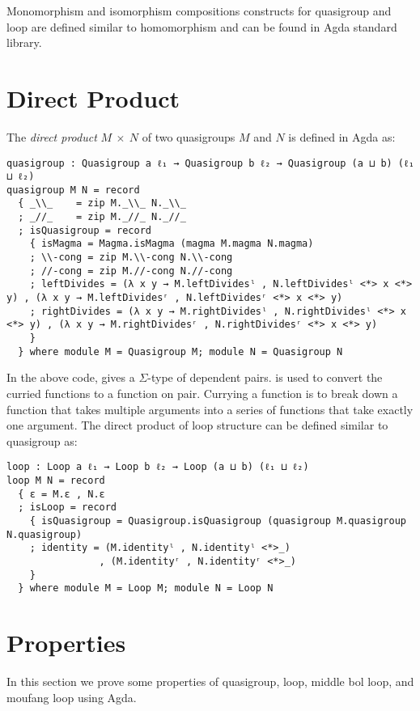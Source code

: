 Monomorphism and isomorphism compositions constructs for quasigroup and loop are
defined similar to homomorphism and can be found in Agda standard library.

\section{Direct Product}
The \textit{direct product} $M \ \times \ N$ of two quasigroups $M$ and $N$ is
defined in Agda as:
\begin{verbatim}
quasigroup : Quasigroup a ℓ₁ → Quasigroup b ℓ₂ → Quasigroup (a ⊔ b) (ℓ₁ ⊔ ℓ₂)
quasigroup M N = record
  { _\\_    = zip M._\\_ N._\\_
  ; _//_    = zip M._//_ N._//_
  ; isQuasigroup = record
    { isMagma = Magma.isMagma (magma M.magma N.magma)
    ; \\-cong = zip M.\\-cong N.\\-cong
    ; //-cong = zip M.//-cong N.//-cong
    ; leftDivides = (λ x y → M.leftDividesˡ , N.leftDividesˡ <*> x <*> y) , (λ x y → M.leftDividesʳ , N.leftDividesʳ <*> x <*> y)
    ; rightDivides = (λ x y → M.rightDividesˡ , N.rightDividesˡ <*> x <*> y) , (λ x y → M.rightDividesʳ , N.rightDividesʳ <*> x <*> y)
    }
  } where module M = Quasigroup M; module N = Quasigroup N
\end{verbatim}
In the above code,  gives a $\Sigma$-type of dependent pairs.
\inline{<*>} is used to convert the curried functions to a function on pair.
Currying a function is to break down a function that takes multiple arguments
into a series of functions that take exactly one argument. The direct product of
loop structure can be defined similar to quasigroup as:
\begin{verbatim}
loop : Loop a ℓ₁ → Loop b ℓ₂ → Loop (a ⊔ b) (ℓ₁ ⊔ ℓ₂)
loop M N = record
  { ε = M.ε , N.ε
  ; isLoop = record
    { isQuasigroup = Quasigroup.isQuasigroup (quasigroup M.quasigroup N.quasigroup)
    ; identity = (M.identityˡ , N.identityˡ <*>_)
                , (M.identityʳ , N.identityʳ <*>_)
    }
  } where module M = Loop M; module N = Loop N
\end{verbatim}

\section{Properties}
In this section we prove some properties of quasigroup, loop, middle bol loop, and moufang loop using
Agda.
